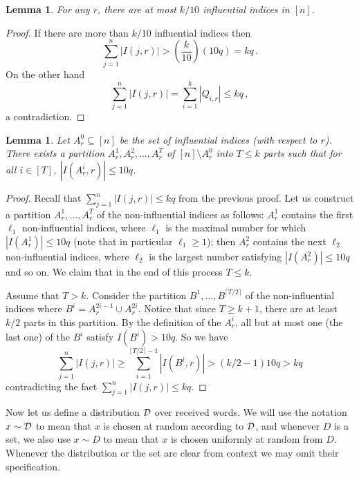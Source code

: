 \documentclass[10pt]{article}
\newtheorem{lemma}[theorem]{Lemma}
\theoremstyle{definition}
\numberwithin{equation}{section}
\newcommand{\DD}{{\cal D}}
\begin{document}
\begin{lemma}\label{lem:inf} For any $r$, there are at most $k/10$ influential indices in $[n]$.
\end{lemma}

\begin{proof} If there are more than $k/10$
influential indices then 
\[
\sum_{j=1}^n |I(j,r)|  > \left(\frac{k}{10}\right)(10 q) = kq\,.
\]
On the other hand 
\[
\sum_{j=1}^n |I(j,r)| =
\sum_{i=1}^k |Q_{i,r}| \leq kq\,,
\]
a contradiction.
\end{proof}

\begin{lemma}\label{lem:partition} Let $A_r^0 \subseteq [n]$ be the set of influential indices (with respect to $r$). There exists a partition $A_r^1, A_r^2, \dots, A_r^T$ of $[n] \setminus A_r^0$ into $T\leq k$ parts such that for all $i \in [T]$, $|I(A_r^i,r)| \leq  10q$.
\end{lemma}

\begin{proof} Recall that $\sum_{j=1}^n |I(j,r)| \leq kq$ from the previous proof. Let us construct a partition $A_r^1, \dots, A_r^T$ of the non-influential indices as follows: $A_r^1$ contains the first $\ell_1$ non-influential indices, where $\ell_1$ is the maximal number for which $|I(A_r^1)| \leq 10q$ (note that in particular $\ell_1\geq 1$); then $A_r^2$ contains the next $\ell_2$ non-influential indices, where $\ell_2$ is the largest number satisfying $|I(A_r^2)| \leq 10q$ and so on. We claim that in the end of this process $T \leq k$.

Assume that $T > k$. Consider the partition $B^1,\ldots ,B^{\lceil T/2 \rceil}$ of the non-influential indices where $B^i = A_r^{2i - 1} \cup A_r^{2i}$. Notice that since $T \geq k+1$, there are at least $k/2$ parts in this partition. By the definition of the 
%
%
%
$A_r^i$, 
all but at most one (the last one) of the 
%
$B^i$
satisfy $I(B^i) > 10q$. So we have $$\sum_{j=1}^n |I(j,r)| \geq \sum_{i=1}^{\lceil T/2\rceil -1} |I(B^i,r)| > (k/2 -1) 10q > kq$$ contradicting the fact $\sum_{j=1}^n |I(j,r)| \leq kq$.
\end{proof}

%
%
%

Now let us define a distribution $\DD$ over received words. We will use the notation $x\sim\DD$ to mean that $x$ is chosen at random according to $\DD$, and whenever $D$ is a set, we also use $x\sim D$ to mean that $x$ is chosen uniformly at random from $D$. Whenever the distribution or the set are clear from context we may omit their specification.
\end{document}

